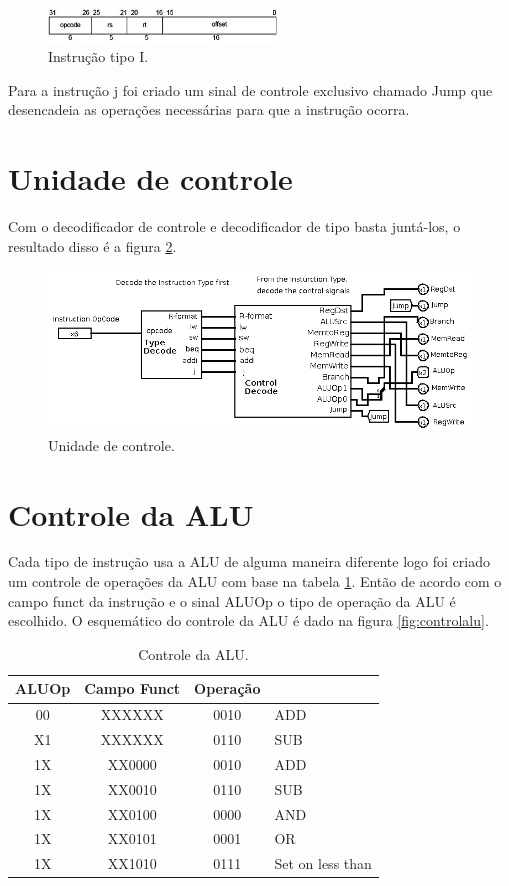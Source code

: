 \documentclass[12pt]{article}
\begin{document}
\begin{figure}[htbp]
\centering
\includegraphics[width=230px]{./itype.png}
\caption{\label{fig:itype}
Instrução tipo I.}
\end{figure}

Para a instrução j foi criado um sinal de controle exclusivo chamado Jump que desencadeia as operações necessárias para que a instrução ocorra.

\section{Unidade de controle}
\label{sec:orgfd38917}

Com o decodificador de controle e decodificador de tipo basta juntá-los, o resultado disso é a figura \ref{fig:controlunit}.

\begin{figure}[htbp]
\centering
\includegraphics[width=.9\linewidth]{./controlunit.png}
\caption{\label{fig:controlunit}
Unidade de controle.}
\end{figure}

\section{Controle da ALU}
\label{sec:org9446161}

Cada tipo de instrução usa a ALU de alguma maneira diferente logo foi criado um controle de operações da ALU com base na tabela \ref{tab:controlalu}. Então de acordo com o campo funct da instrução e o sinal ALUOp o tipo de operação da ALU é escolhido. O esquemático do controle da ALU é dado na figura \ref{fig:controlalu}.

\begin{table}[htbp]
\centering
\begin{tabular}{|c|c|c|l}
ALUOp & Campo Funct & Operação & \\
\hline
00 & XXXXXX & 0010 & ADD\\
X1 & XXXXXX & 0110 & SUB\\
1X & XX0000 & 0010 & ADD\\
1X & XX0010 & 0110 & SUB\\
1X & XX0100 & 0000 & AND\\
1X & XX0101 & 0001 & OR\\
1X & XX1010 & 0111 & Set on less than\\
\hline
\end{tabular}
\caption{\label{tab:controlalu}
Controle da ALU.}

\end{table}
\end{document}
